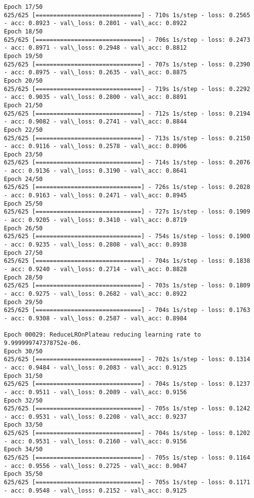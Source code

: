 \documentclass[11pt]{article}
\begin{document}
\begin{Verbatim}[commandchars=\\\{\}]
Epoch 17/50
625/625 [==============================] - 710s 1s/step - loss: 0.2565 - acc: 0.8923 - val\_loss: 0.2801 - val\_acc: 0.8922
Epoch 18/50
625/625 [==============================] - 706s 1s/step - loss: 0.2473 - acc: 0.8971 - val\_loss: 0.2948 - val\_acc: 0.8812
Epoch 19/50
625/625 [==============================] - 707s 1s/step - loss: 0.2390 - acc: 0.8975 - val\_loss: 0.2635 - val\_acc: 0.8875
Epoch 20/50
625/625 [==============================] - 719s 1s/step - loss: 0.2292 - acc: 0.9035 - val\_loss: 0.2800 - val\_acc: 0.8891
Epoch 21/50
625/625 [==============================] - 712s 1s/step - loss: 0.2194 - acc: 0.9082 - val\_loss: 0.2741 - val\_acc: 0.8844
Epoch 22/50
625/625 [==============================] - 713s 1s/step - loss: 0.2150 - acc: 0.9116 - val\_loss: 0.2578 - val\_acc: 0.8906
Epoch 23/50
625/625 [==============================] - 714s 1s/step - loss: 0.2076 - acc: 0.9136 - val\_loss: 0.3190 - val\_acc: 0.8641
Epoch 24/50
625/625 [==============================] - 726s 1s/step - loss: 0.2028 - acc: 0.9163 - val\_loss: 0.2471 - val\_acc: 0.8945
Epoch 25/50
625/625 [==============================] - 727s 1s/step - loss: 0.1909 - acc: 0.9205 - val\_loss: 0.3410 - val\_acc: 0.8719
Epoch 26/50
625/625 [==============================] - 754s 1s/step - loss: 0.1900 - acc: 0.9235 - val\_loss: 0.2808 - val\_acc: 0.8938
Epoch 27/50
625/625 [==============================] - 704s 1s/step - loss: 0.1838 - acc: 0.9240 - val\_loss: 0.2714 - val\_acc: 0.8828
Epoch 28/50
625/625 [==============================] - 703s 1s/step - loss: 0.1809 - acc: 0.9275 - val\_loss: 0.2682 - val\_acc: 0.8922
Epoch 29/50
625/625 [==============================] - 704s 1s/step - loss: 0.1763 - acc: 0.9308 - val\_loss: 0.2587 - val\_acc: 0.8984

Epoch 00029: ReduceLROnPlateau reducing learning rate to 9.999999747378752e-06.
Epoch 30/50
625/625 [==============================] - 702s 1s/step - loss: 0.1314 - acc: 0.9484 - val\_loss: 0.2083 - val\_acc: 0.9125
Epoch 31/50
625/625 [==============================] - 704s 1s/step - loss: 0.1237 - acc: 0.9511 - val\_loss: 0.2089 - val\_acc: 0.9156
Epoch 32/50
625/625 [==============================] - 705s 1s/step - loss: 0.1242 - acc: 0.9531 - val\_loss: 0.2208 - val\_acc: 0.9237
Epoch 33/50
625/625 [==============================] - 704s 1s/step - loss: 0.1202 - acc: 0.9531 - val\_loss: 0.2160 - val\_acc: 0.9156
Epoch 34/50
625/625 [==============================] - 705s 1s/step - loss: 0.1164 - acc: 0.9556 - val\_loss: 0.2725 - val\_acc: 0.9047
Epoch 35/50
625/625 [==============================] - 705s 1s/step - loss: 0.1171 - acc: 0.9548 - val\_loss: 0.2152 - val\_acc: 0.9125


\end{Verbatim}
\end{document}
